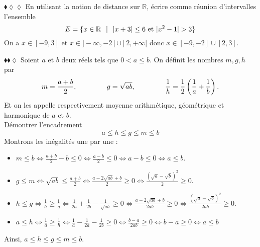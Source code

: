 \documentclass[11pt]{article}
\begin{document}
\begin{exercice}{$\blacklozenge\lozenge\lozenge$}{}
    En utilisant la notion de distance sur $\mathbb{R}$, écrire comme réunion d'intervalles l'ensemble
    \begin{equation*}
        E=\{x\in\mathbb{R} \hspace{0.25cm} | \hspace{0.25cm} |x+3| \leq 6 \text{ et } |x^2-1| > 3\}
    \end{equation*}
    \tcblower
    On a $x\in[-9,3] \text{ et } x\in]-\infty, -2[\cup]2,+\infty[$ donc $x\in[-9,-2]\cup[2,3]$.
\end{exercice}

\begin{exercice}{$\blacklozenge\blacklozenge\lozenge$}{}
    Soient $a$ et $b$ deux réels tels que $0 < a \leq b$. On définit les nombres $m,g,h$ par
    \begin{equation*}
        m=\frac{a+b}{2}, \hspace{1.5cm} g=\sqrt{ab}, \hspace{1.5cm} \frac{1}{h}=\frac{1}{2}\left(\frac{1}{a}+\frac{1}{b}\right).
    \end{equation*}
    Et on les appelle respectivement moyenne arithmétique, géométrique et harmonique de $a$ et $b$.\\
    Démontrer l'encadrement
    \begin{equation*}
        a \leq h \leq g \leq m \leq b
    \end{equation*}
    \tcblower
    Montrons les inégalités une par une :
    \begin{itemize}
        \item $m \leq b \iff \frac{a+b}{2}-b\leq 0 \iff \frac{a-b}{2} \leq 0 \iff a - b \leq 0 \iff a \leq b$.
        \item $g \leq m \iff \sqrt{ab} \leq \frac{a+b}{2} \iff \frac{a - 2\sqrt{ab} + b}{2} \geq 0 \iff \frac{(\sqrt{a}-\sqrt{b})^2}{2} \geq 0$.
        \item $h \leq g \iff \frac{1}{h} \geq \frac{1}{g} \iff \frac{1}{2a}+\frac{1}{2b}-\frac{1}{\sqrt{ab}} \geq 0 \iff \frac{a-2\sqrt{ab}+b}{2ab} \geq 0 \iff \frac{(\sqrt{a}-\sqrt{b})^2}{2ab}\geq0$.
        \item $a \leq h \iff \frac{1}{a} \geq \frac{1}{h} \iff \frac{1}{a}-\frac{1}{2a}-\frac{1}{2b}\geq 0 \iff \frac{b-a}{2ab}\geq0 \iff b-a\geq 0 \iff a \leq b$
    \end{itemize}
    Ainsi, $a\leq h \leq g \leq m \leq b$.
\end{exercice}
\end{document}
